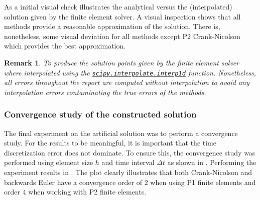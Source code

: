 \documentclass{article}
\newtheorem{remark}{Remark}[section]
\begin{document}
As a initial visual check  illustrates the analytical versus the (interpolated) solution given by the finite element solver. A visual inspection shows that all methods provide a reasonable approximation of the solution. There is, nonetheless, some visual deviation for all methods except P2 Crank-Nicolson which provides the best approximation.

\begin{remark}
    To produce  the solution points given by the finite element solver where interpolated using the \href{https://docs.scipy.org/doc/scipy/reference/generated/scipy.interpolate.interp1d.html}{\texttt{scipy.interpolate.interp1d}} function. Nonetheless, all errors throughout the report are computed without interpolation to avoid any interpolation errors contaminating the true errors of the methods.
\end{remark}



\subsubsection{Convergence study of the constructed solution}
The final experiment on the artificial solution was to perform a convergence study. For the results to be meaningful, it is important that the time discretization error does not dominate. To ensure this, the convergence study was performed using element size $h$ and time interval $\Delta t$ as shown in . Performing the experiment results in . The plot clearly illustrates that both Crank-Nicolson and backwards Euler have a convergence order of $2$ when using P1 finite elements and order $4$ when working with P2 finite elements. \\
\end{document}
